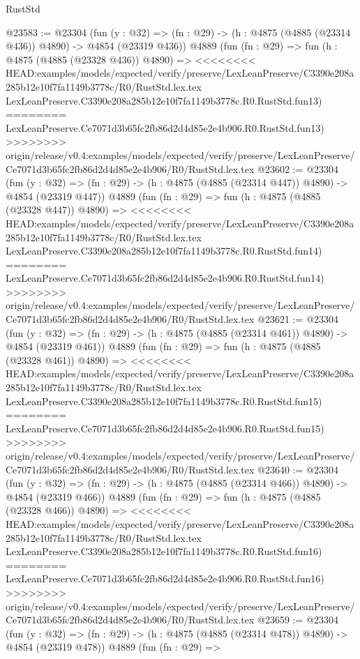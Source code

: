 \begin{lexlean}{RustStd}
\begin{coremodule}
{\begin{coremodule}
{{{{{{{{{{{{{{{{{{{{{{{{{{{{{@23583 := @23304
    (fun (y : @32) => (fn : @29) -> (h : @4875 (@4885 (@23314 @436)) @4890) -> @4854 (@23319 @436))
    @4889
    (fun (fn : @29) =>
    fun (h : @4875 (@4885 (@23328 @436)) @4890) =>
<<<<<<<< HEAD:examples/models/expected/verify/preserve/LexLeanPreserve/C3390e208a285b12e10f7fa1149b3778c/R0/RustStd.lex.tex
    LexLeanPreserve.C3390e208a285b12e10f7fa1149b3778c.R0.RustStd.fun13)
========
    LexLeanPreserve.Ce7071d3b65fc2fb86d2d4d85e2e4b906.R0.RustStd.fun13)
>>>>>>>> origin/release/v0.4:examples/models/expected/verify/preserve/LexLeanPreserve/Ce7071d3b65fc2fb86d2d4d85e2e4b906/R0/RustStd.lex.tex
@23602 := @23304
    (fun (y : @32) => (fn : @29) -> (h : @4875 (@4885 (@23314 @447)) @4890) -> @4854 (@23319 @447))
    @4889
    (fun (fn : @29) =>
    fun (h : @4875 (@4885 (@23328 @447)) @4890) =>
<<<<<<<< HEAD:examples/models/expected/verify/preserve/LexLeanPreserve/C3390e208a285b12e10f7fa1149b3778c/R0/RustStd.lex.tex
    LexLeanPreserve.C3390e208a285b12e10f7fa1149b3778c.R0.RustStd.fun14)
========
    LexLeanPreserve.Ce7071d3b65fc2fb86d2d4d85e2e4b906.R0.RustStd.fun14)
>>>>>>>> origin/release/v0.4:examples/models/expected/verify/preserve/LexLeanPreserve/Ce7071d3b65fc2fb86d2d4d85e2e4b906/R0/RustStd.lex.tex
@23621 := @23304
    (fun (y : @32) => (fn : @29) -> (h : @4875 (@4885 (@23314 @461)) @4890) -> @4854 (@23319 @461))
    @4889
    (fun (fn : @29) =>
    fun (h : @4875 (@4885 (@23328 @461)) @4890) =>
<<<<<<<< HEAD:examples/models/expected/verify/preserve/LexLeanPreserve/C3390e208a285b12e10f7fa1149b3778c/R0/RustStd.lex.tex
    LexLeanPreserve.C3390e208a285b12e10f7fa1149b3778c.R0.RustStd.fun15)
========
    LexLeanPreserve.Ce7071d3b65fc2fb86d2d4d85e2e4b906.R0.RustStd.fun15)
>>>>>>>> origin/release/v0.4:examples/models/expected/verify/preserve/LexLeanPreserve/Ce7071d3b65fc2fb86d2d4d85e2e4b906/R0/RustStd.lex.tex
@23640 := @23304
    (fun (y : @32) => (fn : @29) -> (h : @4875 (@4885 (@23314 @466)) @4890) -> @4854 (@23319 @466))
    @4889
    (fun (fn : @29) =>
    fun (h : @4875 (@4885 (@23328 @466)) @4890) =>
<<<<<<<< HEAD:examples/models/expected/verify/preserve/LexLeanPreserve/C3390e208a285b12e10f7fa1149b3778c/R0/RustStd.lex.tex
    LexLeanPreserve.C3390e208a285b12e10f7fa1149b3778c.R0.RustStd.fun16)
========
    LexLeanPreserve.Ce7071d3b65fc2fb86d2d4d85e2e4b906.R0.RustStd.fun16)
>>>>>>>> origin/release/v0.4:examples/models/expected/verify/preserve/LexLeanPreserve/Ce7071d3b65fc2fb86d2d4d85e2e4b906/R0/RustStd.lex.tex
@23659 := @23304
    (fun (y : @32) => (fn : @29) -> (h : @4875 (@4885 (@23314 @478)) @4890) -> @4854 (@23319 @478))
    @4889
    (fun (fn : @29) =>
}}}}}}}}}}}}}}}}}}}}}}}}}}}}}
\end{coremodule}}
\end{coremodule}
\end{lexlean}
